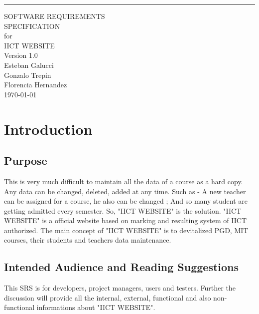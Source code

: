 \documentclass{scrreprt}
\date{}
\def\myversion{1.0 }
\begin{document}
\begin{flushright}
    \rule{16cm}{5pt}\vskip1cm
    \begin{bfseries}
        \Huge{SOFTWARE REQUIREMENTS\\ SPECIFICATION}\\
        \vspace{1.5cm}
        for\\
        \vspace{1.5cm}
        IICT WEBSITE\\
        \vspace{1.5cm}
        \LARGE{Version \myversion}\\
        \vspace{1.5cm}
        Esteban Galucci \\
        Gonzalo Trepin \\
        Florencia Hernandez \\
        \today\\
    \end{bfseries}
\end{flushright}

\tableofcontents

\chapter{Introduction}

\section{Purpose}
This is very much difficult to maintain all the data of a course as a hard copy. Any data can be changed, deleted, added at any time. Such as - A new teacher can be assigned for a course, he also can be changed ; And so many student are getting admitted every semester. So, "IICT WEBSITE" is the solution. "IICT WEBSITE" is a official website based on marking and resulting system of IICT authorized. The main concept of "IICT WEBSITE" is to devitalized PGD, MIT courses, their students and teachers data maintenance. 

\section{Intended Audience and Reading Suggestions}
This SRS is for developers, project managers, users and testers. Further the discussion will provide all the internal, external, functional and also non-functional informations about "IICT WEBSITE".
\end{document}
